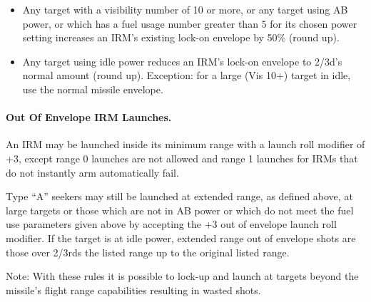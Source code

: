 \begin{itemize}

    \item Any target with a visibility number of 10 or more, or any target using AB power, or which has a fuel usage number greater than 5 for its chosen power setting increases an IRM's existing lock-on envelope by 50\% (round up).

    \item Any target using idle power reduces an IRM's lock-on envelope to 2/3d's normal amount (round up). Exception: for a large (Vis 10+) target in idle, use the normal missile envelope.

\end{itemize}

\paragraph{Out Of Envelope IRM Launches.} An IRM may be launched inside its minimum range with a launch roll modifier of +3, except range 0 launches are not allowed and range 1 launches for IRMs that do not instantly arm automatically fail.

Type “A” seekers may still be launched at extended range, as defined above, at large targets or those which are not in AB power or which do not meet the fuel use parameters given above by accepting the +3 out of envelope launch roll modifier. If the target is at idle power, extended range out of envelope shots are those over 2/3rds the listed range up to the original listed range.

Note: With these rules it is possible to lock-up and launch at targets beyond the missile's flight range capabilities resulting in wasted shots.